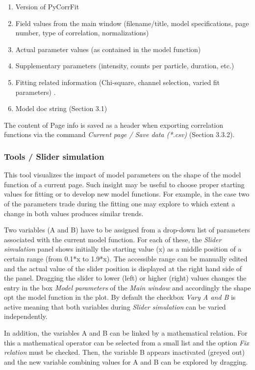 \begin{enumerate}
\item Version of PyCorrFit
\item Field values from the main window (filename/title, model specifications, page number, type of correlation, normalizations)
\item Actual parameter values (as contained in the model function)
\item Supplementary parameters (intensity, counts per particle, duration, etc.)
\item Fitting related information (Chi-square, channel selection, varied fit parameters) .
\item Model doc string (Section 3.1)
\end{enumerate}
The content of Page info is saved as a header when exporting correlation functions via the command \textit{Current page / Save data (*.csv)} (Section 3.3.2).

\subsubsection{Tools / Slider simulation}
\label{sec:tm.ss}
This tool visualizes the impact of model parameters on the shape of the model function of a current page. Such insight may be useful to choose proper starting values for fitting or to develop new model functions. For example, in the case two of the parameters trade during the fitting one may explore to which extent a change in both values produces similar trends.

Two variables (A and B) have to be assigned from a drop-down list of parameters associated with the current model function. For each of these, the \textit{Slider simulation} panel shows initially the starting value (x) as a middle position of a certain range (from 0.1*x to 1.9*x). The accessible range can be manually edited and the actual value of the slider position is displayed at the right hand side of the panel. Dragging the slider to lower (left) or higher (right) values changes the entry in the box \textit{Model parameters} of the \textit{Main window} and accordingly the shape opt the model function in the plot. By default the checkbox \textit{Vary A and B}\textit{ }is active meaning that both variables during \textit{Slider simulation} can be varied independently. 

In addition, the variables A and B can be linked by a mathematical relation. For this a mathematical operator can be selected from a small list and the option \textit{Fix relation} must be checked. Then, the variable B appears inactivated (greyed out) and the new variable combining values for A and B can be explored by dragging.

